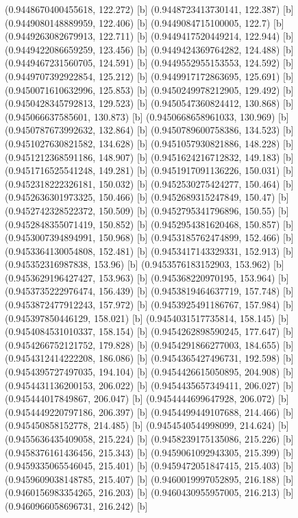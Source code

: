 {{{(0.9448670400455618, 122.272) [b] 
(0.9448723413730141, 122.387) [b] 
(0.9449080148889959, 122.406) [b] 
(0.9449084715100005, 122.7) [b] 
(0.9449263082679913, 122.711) [b] 
(0.9449417520449214, 122.944) [b] 
(0.9449422086659259, 123.456) [b] 
(0.9449424369764282, 124.488) [b] 
(0.9449467231560705, 124.591) [b] 
(0.9449552955153553, 124.592) [b] 
(0.9449707392922854, 125.212) [b] 
(0.9449917172863695, 125.691) [b] 
(0.9450071610632996, 125.853) [b] 
(0.9450249978212905, 129.492) [b] 
(0.9450428345792813, 129.523) [b] 
(0.9450547360824412, 130.868) [b] 
(0.945066637585601, 130.873) [b] 
(0.9450668658961033, 130.969) [b] 
(0.9450787673992632, 132.864) [b] 
(0.9450789600758386, 134.523) [b] 
(0.9451027630821582, 134.628) [b] 
(0.9451057930821886, 148.228) [b] 
(0.9451212368591186, 148.907) [b] 
(0.9451624216712832, 149.183) [b] 
(0.9451716525541248, 149.281) [b] 
(0.9451917091136226, 150.031) [b] 
(0.9452318222326181, 150.032) [b] 
(0.9452530275424277, 150.464) [b] 
(0.9452636301973325, 150.466) [b] 
(0.9452689315247849, 150.47) [b] 
(0.9452742328522372, 150.509) [b] 
(0.9452795341796896, 150.55) [b] 
(0.9452848355071419, 150.852) [b] 
(0.9452954381620468, 150.857) [b] 
(0.9453007394894991, 150.968) [b] 
(0.9453185762474899, 152.466) [b] 
(0.9453364130054808, 152.481) [b] 
(0.9453417143329331, 152.913) [b] 
(0.945352316987838, 153.96) [b] 
(0.9453576183152903, 153.962) [b] 
(0.9453629196427427, 153.963) [b] 
(0.945368220970195, 153.964) [b] 
(0.9453735222976474, 156.439) [b] 
(0.9453819464637719, 157.748) [b] 
(0.9453872477912243, 157.972) [b] 
(0.9453925491186767, 157.984) [b] 
(0.945397850446129, 158.021) [b] 
(0.9454031517735814, 158.145) [b] 
(0.9454084531010337, 158.154) [b] 
(0.9454262898590245, 177.647) [b] 
(0.9454266752121752, 179.828) [b] 
(0.9454291866277003, 184.655) [b] 
(0.9454312414222208, 186.086) [b] 
(0.9454365427496731, 192.598) [b] 
(0.9454395727497035, 194.104) [b] 
(0.9454426615050895, 204.908) [b] 
(0.9454431136200153, 206.022) [b] 
(0.9454435657349411, 206.027) [b] 
(0.945444017849867, 206.047) [b] 
(0.9454444699647928, 206.072) [b] 
(0.9454449220797186, 206.397) [b] 
(0.9454499449107688, 214.466) [b] 
(0.945450858152778, 214.485) [b] 
(0.9454540544998099, 214.624) [b] 
(0.9455636435409058, 215.224) [b] 
(0.9458239175135086, 215.226) [b] 
(0.9458376161436456, 215.343) [b] 
(0.9459061092943305, 215.399) [b] 
(0.9459335065546045, 215.401) [b] 
(0.9459472051847415, 215.403) [b] 
(0.9459609038148785, 215.407) [b] 
(0.9460019997052895, 216.188) [b] 
(0.9460156983354265, 216.203) [b] 
(0.9460430955957005, 216.213) [b] 
(0.9460966058696731, 216.242) [b] 
}}}
